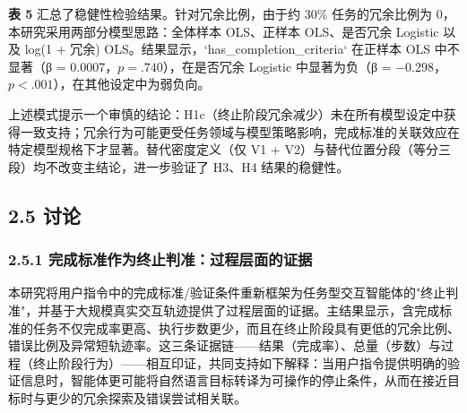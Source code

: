 \documentclass[12pt,a4paper,openany,oneside]{ctexrep}
\begin{document}
\textbf{表 5} 汇总了稳健性检验结果。针对冗余比例，由于约 30\% 任务的冗余比例为 0，本研究采用两部分模型思路：全体样本 OLS、正样本 OLS、是否冗余 Logistic 以及 log(1 + 冗余) OLS。结果显示，`has\_completion\_criteria` 在正样本 OLS 中不显著（β = 0.0007，$p=.740$），在是否冗余 Logistic 中显著为负（β = −0.298，$p<.001$），在其他设定中为弱负向。

上述模式提示一个审慎的结论：H1c（终止阶段冗余减少）未在所有模型设定中获得一致支持；冗余行为可能更受任务领域与模型策略影响，完成标准的关联效应在特定模型规格下才显著。替代密度定义（仅 V1 + V2）与替代位置分段（等分三段）均不改变主结论，进一步验证了 H3、H4 结果的稳健性。


\begin{table}[htbp]
\centering
\caption{表 5：稳健性检验：冗余比例、替代密度与替代位置定义}
\small
{}
\end{table}

\subsection{2.5 讨论}


\subsubsection{2.5.1 完成标准作为终止判准：过程层面的证据}


本研究将用户指令中的完成标准/验证条件重新框架为任务型交互智能体的"终止判准"，并基于大规模真实交互轨迹提供了过程层面的证据。主结果显示，含完成标准的任务不仅完成率更高、执行步数更少，而且在终止阶段具有更低的冗余比例、错误比例及异常短轨迹率。这三条证据链——结果（完成率）、总量（步数）与过程（终止阶段行为）——相互印证，共同支持如下解释：当用户指令提供明确的验证信息时，智能体更可能将自然语言目标转译为可操作的停止条件，从而在接近目标时与更少的冗余探索及错误尝试相关联。
\end{document}
